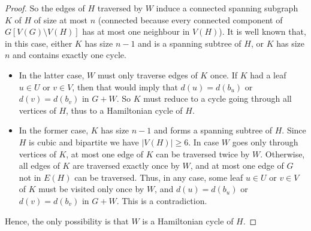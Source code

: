 \documentclass[a4paper,11pt,dvipsnames]{elsarticle}
\newcommand{\sam}[1]{\todo[size=\tiny,color=red!20!white]{\textbf{Sam:} #1}}
\newcommand{\sam}[1]{}
\begin{document}
\begin{proof}
So the edges of $H$ traversed by $W$ induce a connected spanning subgraph $K$
of $H$ of size at most $n$ (connected because every connected component of $G[V(G) \setminus V(H)]$ has at most one neighbour in $V(H)$). It is well known that, in this case, either $K$ has size $n-1$ and is a spanning subtree
of $H$, or $K$ has size $n$ and contains exactly one cycle. 

\begin{itemize}
    \item In the latter case, $W$ must only traverse
edges of $K$ once. If $K$ had a leaf $u\in U$ or $v\in V$, then that would imply that $d(u)=d(b_u)$ or $d(v)=d(b_v)$ in $G+W$.
So $K$ must reduce to a cycle going through all vertices of $H$, thus to a Hamiltonian cycle of $H$.
\item In the former case,
$K$ has size $n-1$ and forms a spanning subtree of $H$. Since $H$ is cubic and bipartite we have $|V(H)|\ge 6$. In case
$W$ goes only through vertices of $K$, at most one edge of $K$ can be traversed twice by $W$. Otherwise, all edges of
$K$ are traversed exactly once by $W$, and at most one edge of $G$ not in $E(H)$ can be traversed. Thus, in any case, some leaf $u \in U$ or $v \in V$ of $K$
must be visited only once by $W$, and $d(u)=d(b_u)$ or $d(v)=d(b_v)$ in $G+W$. This is a contradiction.
\end{itemize}

\noindent Hence, the only possibility is that $W$ is a Hamiltonian cycle of $H$.



\end{proof}
\end{document}
